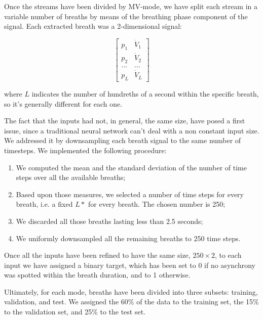 \documentclass[a4paper, twoside]{article}
\begin{document}
        Once the streams have been divided by MV-mode, we have split each stream in a variable number of breaths by means of the breathing phase component of the signal. Each extracted breath was a 2-dimensional signal:

        \[
        \begin{bmatrix}
            p_1       & \dot{V}_1 \\
            p_2       & \dot{V}_2 \\

            \dots     & \dots \\
            p_L       & \dot{V}_L
        \end{bmatrix}
        \]

        where $L$ indicates the number of hundreths of a second within the specific breath, so it's generally different for each one.

        The fact that the inputs had not, in general, the same size, have posed a first issue, since a traditional neural network can't deal with a non constant input size. We addressed it by downsampling each breath signal to the same number of timesteps. We implemented the following procedure:

        \begin{enumerate}
            \item We computed the mean and the standard deviation of the number of time steps over all the available breaths;
            \item Based upon those measures, we selected a number of time steps for every breath, i.e. a fixed $L*$ for every breath. The chosen number is 250;
            \item We discarded all those breaths lasting less than 2.5 seconds;
            \item We uniformly downsampled all the remaining breaths to 250 time steps.
        \end{enumerate}

        Once all the inputs have been refined to have the same size, $250 \times 2$, to each input we have assigned a binary target, which has been set to 0 if no asynchrony was spotted within the breath duration, and to 1 otherwise.

        Ultimately, for each mode, breaths have been divided into three subsets: training, validation, and test. We assigned the 60\% of the data to the training set, the 15\% to the validation set, and 25\% to the test set.
\end{document}
